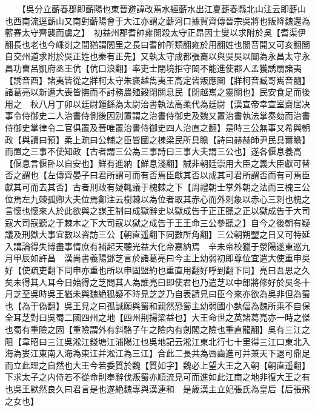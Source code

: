 　　【吳分立蘄春郡即蘄陽也東晉避諱改焉水經蘄水出江夏蘄春縣北山注云即蘄山也西南流逕蘄山又南對蘄陽會于大江亦謂之蘄河口據賀齊傳晉宗吳將也叛降魏還為蘄春太守齊襲而虜之】　初益州郡耆帥雍闓殺太守正昂因士燮以求附於吳【耆渠伊翻長也老也今嵊剡之間猶謂閭里之長曰耆帥所類翻雍於用翻姓也闓音開又可亥翻闓自交州道求附於吳正姓也秦有正先】又執太守成都張裔以與吳吳以闓為永昌太守永昌功曹呂凱府丞王伉【伉口浪翻】率吏士閉境拒守闓不能進使郡人孟獲誘扇諸夷【誘音酉】諸夷皆從之牂柯太守朱褒越雋夷王高定皆叛應闓【牂柯音臧哥嶲音髓】諸葛亮以新遭大喪皆撫而不討務農殖穀閉關息民【閉越嶲之靈關也】民安食足而後用之　秋八月丁卯以廷尉鍾繇為太尉治書執法高柔代為廷尉【漢宣帝幸宣室齋居决事令侍御史二人治書侍側後因别置謂之治書侍御史及魏又置治書執法掌奏劾而治書侍御史掌律令二官俱置及晉唯置治書侍御史四人治直之翻】是時三公無事又希與朝政【與讀曰預】柔上疏曰公輔之臣皆國之棟梁民所具瞻【詩曰赫赫師尹民具爾瞻】而置之三事不使知政【古者謂三公為三事詩曰三事大夫謂三公也】遂各偃息養高【偃息言偃卧以自安也】鮮有進納【鮮息淺翻】誠非朝廷崇用大臣之義大臣獻可替否之謂也【左傳齊晏子曰君所謂可而有否焉臣獻其否以成其可君所謂否而有可焉臣獻其可而去其否】古者刑政有疑輒議于槐棘之下【周禮朝士掌外朝之法而三槐三公位焉左九棘孤卿大夫位焉鄭注云樹棘以為位者取其赤心而外刺象以赤心三刺也槐之言懷也懷來人於此欲與之謀王制曰成獄辭史以獄成告于正正聽之正以獄成告于大司寇大司寇聽之于棘木之下大司寇以獄之成告于王王命三公參聽之】自今之後朝有疑議及刑獄大事宜數以咨訪三公【朝直遥翻下同數所角翻】三公朝朔朢之日又可特延入講論得失博盡事情庶有補起天聽光益大化帝嘉納焉　辛未帝校獵于滎陽遂東巡九月甲辰如許昌　漢尚書義陽鄧芝言於諸葛亮曰今主上幼弱初即尊位宜遣大使重申吳好【使疏吏翻下同申亦重也所以申固盟約也重直用翻好呼到翻下同】亮曰吾思之久矣未得其人耳今日始得之芝問其人為誰亮曰即使君也乃遣芝以中郎將修好於吳冬十月芝至吳時吳王猶未與魏絶狐疑不時見芝芝乃自表請見曰臣今來亦欲為吳非但為蜀也【為于偽翻】吳王見之曰孤誠願與蜀和親然恐蜀主幼弱國小埶偪為魏所乘不自保全耳芝對曰吳蜀二國四州之地【四州荆揚梁益也】大王命世之英諸葛亮亦一時之傑也蜀有重險之固【重險謂外有斜駱子午之險内有劍閣之險也重直龍翻】吳有三江之阻【韋昭曰三江吳淞江錢塘江浦陽江也吳地記云淞江東北行七十里得三江口東北入海為婁江東南入海為東江并淞江為三江】合此二長共為唇齒進可并兼天下退可鼎足而立此理之自然也大王今若委質於魏【質如字】魏必上望大王之入朝【朝直遥翻】下求太子之内侍若不從命則奉辭伐叛蜀亦順流見可而進如此江南之地非復大王之有也吳王默然良久曰君言是也遂絶魏專與漢連和　是歲漢主立妃張氏為皇后【后張飛之女也】

